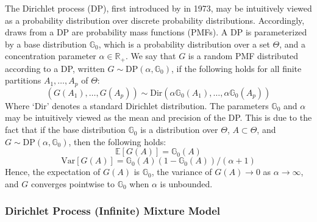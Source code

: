 \documentclass{article}
\begin{document}
The Dirichlet process (DP), first introduced by \cite{ferguson_1973} in 1973, may be intuitively viewed as a probability distribution over discrete probability distributions. Accordingly, draws from a DP are probability mass functions (PMFs). A DP is parameterized by a base distribution $\mathbb{G}_{0}$, which is a probability distribution over a set $\Theta$, and a concentration parameter $\alpha \in \mathbb{R}_{+}$. We say that $G$ is a random PMF distributed according to a DP, written $G \sim \text{DP}(\alpha, \mathbb{G}_{0})$, if the following holds for all finite partitions $A_{1}, \ldots, A_{p}$ of $\Theta$:
\begin{equation}
(G(A_{1}), \ldots, G(A_{p})) \sim \text{Dir}(\alpha \mathbb{G}_{0}(A_{1}), \ldots, \alpha \mathbb{G}_{0}(A_{p}))
\end{equation}
Where `Dir' denotes a standard Dirichlet distribution. The parameters $\mathbb{G}_{0}$ and $\alpha$ may be intuitively viewed as the mean and precision of the DP. This is due to the fact that if the base distribution $\mathbb{G}_{0}$ is a distribution over $\Theta$, $A \subset \Theta$, and $G \sim \text{DP}(\alpha, \mathbb{G}_{0})$, then the following holds:
\begin{equation}
\mathbb{E}[G(A)] = \mathbb{G}_{0}(A)
\end{equation}
\begin{equation}
\text{Var}[G(A)] = \mathbb{G}_{0}(A) (1 - \mathbb{G}_{0}(A)) / (\alpha + 1)
\end{equation}
Hence, the expectation of $G(A)$ is $\mathbb{G}_{0}$, the variance of $G(A) \rightarrow 0$ as $\alpha \rightarrow \infty$, and $G$ converges pointwise to $\mathbb{G}_{0}$ when $\alpha$ is unbounded.



\subsubsection{Dirichlet Process (Infinite) Mixture Model}
\end{document}
